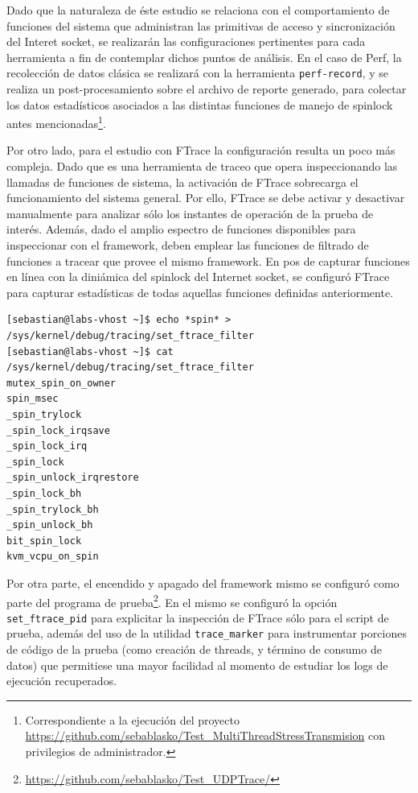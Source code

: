 Dado que la naturaleza de éste estudio se relaciona con el comportamiento de funciones del sistema que administran las primitivas de acceso y sincronización del Interet socket, se realizarán las configuraciones pertinentes para cada herramienta a fin de contemplar dichos puntos de análisis. En el caso de Perf, la recolección de datos clásica se realizará con la herramienta \verb=perf-record=, y se realiza un post-procesamiento sobre el archivo de reporte generado, para colectar los datos estadísticos asociados a las distintas funciones de manejo de spinlock antes mencionadas\footnote{Correspondiente a la ejecución del proyecto \url{https://github.com/sebablasko/Test_MultiThreadStressTransmision} con privilegios de administrador.}.

Por otro lado, para el estudio con FTrace la configuración resulta un poco más compleja. Dado que es una herramienta de traceo que opera inspeccionando las llamadas de funciones de sistema, la activación de FTrace sobrecarga el funcionamiento del sistema general. Por ello, FTrace se debe activar y desactivar manualmente para analizar sólo los instantes de operación de la prueba de interés. Además, dado el amplio espectro de funciones disponibles para inspeccionar con el framework, deben emplear las funciones de filtrado de funciones a tracear que provee el mismo framework. En pos de capturar funciones en línea con la diniámica del spinlock del Internet socket, se configuró FTrace para capturar estadísticas de todas aquellas funciones definidas anteriormente.

\begin{lstlisting}[style=BashInputStyle, label={code:ftrace}, caption={Configuración de filtros de FTrace sobre funciones a estudiar.}, captionpos=b]
[sebastian@labs-vhost ~]$ echo *spin* > /sys/kernel/debug/tracing/set_ftrace_filter 
[sebastian@labs-vhost ~]$ cat /sys/kernel/debug/tracing/set_ftrace_filter 
mutex_spin_on_owner
spin_msec
_spin_trylock
_spin_lock_irqsave
_spin_lock_irq
_spin_lock
_spin_unlock_irqrestore
_spin_lock_bh
_spin_trylock_bh
_spin_unlock_bh
bit_spin_lock
kvm_vcpu_on_spin
\end{lstlisting}

Por otra parte, el encendido y apagado del framework mismo se configuró como parte del programa de prueba\footnote{\url{https://github.com/sebablasko/Test_UDPTrace/}}. En el mismo se configuró la opción \verb=set_ftrace_pid= para explicitar la inspección de FTrace sólo para el script de prueba, además del uso de la utilidad \verb=trace_marker= para instrumentar porciones de código de la prueba (como creación de threads, y término de consumo de datos) que permitiese una mayor facilidad al momento de estudiar los logs de ejecución recuperados.

